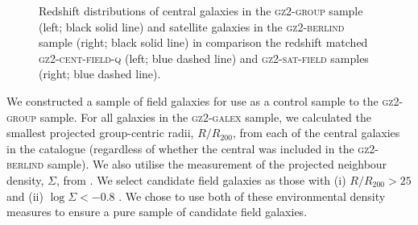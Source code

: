\documentclass[useAMS,usenatbib]{mn2e}
\begin{document}
\begin{figure}
\caption[Redshift distribution of galaxies in the \textsc{gz2-berlind} and \textsc{gz2-group} samples]{Redshift distributions of central galaxies in the \textsc{gz2-group} sample (left; black solid line) and satellite galaxies in the \textsc{gz2-berlind} sample (right; black solid line) in comparison the redshift matched \textsc{gz2-cent-field-q} (left; blue dashed line) and \textsc{gz2-sat-field} samples (right; blue dashed line).}
\label{fig:zcompare}
\end{figure}

We constructed a sample of field galaxies for use as a control sample to the \textsc{gz2-group} sample. For all galaxies in the \textsc{gz2-galex} sample, we calculated the smallest projected group-centric radii, $R/R_{200}$, from each of the central galaxies in the \citet{berlind06} catalogue (regardless of whether the central was included in the \textsc{gz2-berlind} sample). We also utilise the measurement of the projected neighbour density, $\Sigma$, from \cite{Baldry06}. We select candidate field galaxies as those with (i) $R/R_{200} > 25$ and (ii) $\log\Sigma < -0.8$ \citep[the threshold on the local environment density which selects field galaxies as defined by][]{Baldry06}. We chose to use both of these environmental density measures to ensure a pure sample of candidate field galaxies.
\end{document}
